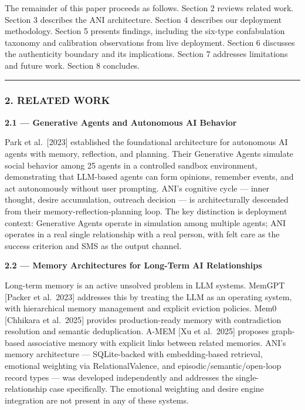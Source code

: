 The remainder of this paper proceeds as follows. Section 2 reviews
related work. Section 3 describes the ANI architecture. Section 4
describes our deployment methodology. Section 5 presents findings,
including the six-type confabulation taxonomy and calibration
observations from live deployment. Section 6 discusses the authenticity
boundary and its implications. Section 7 addresses limitations and
future work. Section 8 concludes.

\begin{center}\rule{0.5\linewidth}{0.5pt}\end{center}

\subsubsection{2. RELATED WORK}\label{related-work}

\textbf{2.1 --- Generative Agents and Autonomous AI Behavior}

Park et al.~{[}2023{]} established the foundational architecture for
autonomous AI agents with memory, reflection, and planning. Their
Generative Agents simulate social behavior among 25 agents in a
controlled sandbox environment, demonstrating that LLM-based agents can
form opinions, remember events, and act autonomously without user
prompting. ANI's cognitive cycle --- inner thought, desire accumulation,
outreach decision --- is architecturally descended from their
memory-reflection-planning loop. The key distinction is deployment
context: Generative Agents operate in simulation among multiple agents;
ANI operates in a real single relationship with a real person, with felt
care as the success criterion and SMS as the output channel.

\textbf{2.2 --- Memory Architectures for Long-Term AI Relationships}

Long-term memory is an active unsolved problem in LLM systems. MemGPT
{[}Packer et al.~2023{]} addresses this by treating the LLM as an
operating system, with hierarchical memory management and explicit
eviction policies. Mem0 {[}Chhikara et al.~2025{]} provides
production-ready memory with contradiction resolution and semantic
deduplication. A-MEM {[}Xu et al.~2025{]} proposes graph-based
associative memory with explicit links between related memories. ANI's
memory architecture --- SQLite-backed with embedding-based retrieval,
emotional weighting via RelationalValence, and
episodic/semantic/open-loop record types --- was developed independently
and addresses the single-relationship case specifically. The emotional
weighting and desire engine integration are not present in any of these
systems.

